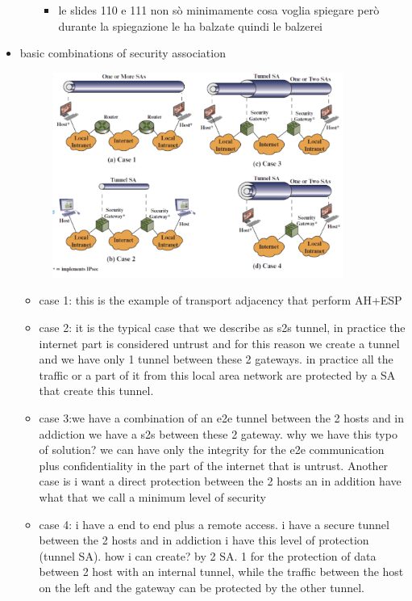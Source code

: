 \documentclass{article}
\begin{document}
\begin{itemize}
\begin{itemize}
\begin{itemize}
            \item le slides 110 e 111 non sò minimamente cosa voglia spiegare però durante la spiegazione le ha balzate quindi le balzerei
        \end{itemize}
    \end{itemize}
    \item basic combinations of security association 
    \begin{figure}[h]
        \centering
        \includegraphics[width=0.90\textwidth]{figure/basic_comb_SA.png}
    \end{figure}
    \begin{itemize}
        \item case 1: this is the example of transport adjacency that perform AH+ESP
        \item case 2: it is the typical case that we describe as s2s tunnel, in practice the internet part is considered untrust and for this reason we create a tunnel and we have only 1 tunnel between these 2 gateways. in practice all the traffic or a part of it from this local area network are protected by a SA that create this tunnel.
        \item case 3:we have a combination of an e2e tunnel between the 2 hosts and in addiction we have a s2s between these 2 gateway. why we have this typo of solution? we can have only the integrity for the e2e communication plus confidentiality in the part of the internet that is untrust. Another case is i want a direct protection between the 2 hosts an in addition have what that we call a minimum level of security
        \item case 4: i have a end to end plus a remote access. i have a secure tunnel between the 2 hosts and in addiction i have this level of protection (tunnel SA). how i can create? by 2 SA. 1 for the protection of data between 2 host with an internal tunnel, while the traffic between the host on the left and the gateway can be protected by the other tunnel.

\end{itemize}
\end{itemize}
\end{document}
